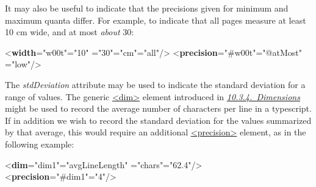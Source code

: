 It may also be useful to indicate that the precisions given for minimum and maximum quanta differ. For example, to indicate that all pages measure at least 10 cm wide, and at most \textit{about} 30: \par\bgroup{}\exampleFont \begin{shaded}\noindent\mbox{}{<\textbf{width}\hspace*{1em}{xml:id}="{w00t}"\hspace*{1em}{atLeast}="{10}"\mbox{}\newline 
\hspace*{1em}{atMost}="{30}"\hspace*{1em}{unit}="{cm}"\hspace*{1em}{scope}="{all}"/>}\mbox{}\newline 
{<\textbf{precision}\hspace*{1em}{target}="{\#w00t}"\hspace*{1em}{match}="{@atMost}"\mbox{}\newline 
\hspace*{1em}{precision}="{low}"/>}\end{shaded}\egroup\par \par
The {\itshape stdDeviation} attribute may be used to indicate the standard deviation for a range of values. The generic \hyperref[TEI.dim]{<dim>} element introduced in \textit{\hyperref[msdim]{10.3.4.\ Dimensions}} might be used to record the average number of characters per line in a typescript. If in addition we wish to record the standard deviation for the values summarized by that average, this would require an additional \hyperref[TEI.precision]{<precision>} element, as in the following example: \par\bgroup{}\exampleFont \begin{shaded}\noindent\mbox{}{<\textbf{dim}\hspace*{1em}{xml:id}="{dim1}"\hspace*{1em}{type}="{avgLineLength}"\mbox{}\newline 
\hspace*{1em}{unit}="{chars}"\hspace*{1em}{quantity}="{62.4}"/>}\mbox{}\newline 
{<\textbf{precision}\hspace*{1em}{target}="{\#dim1}"\hspace*{1em}{stdDeviation}="{4}"/>}\end{shaded}\egroup\par 
